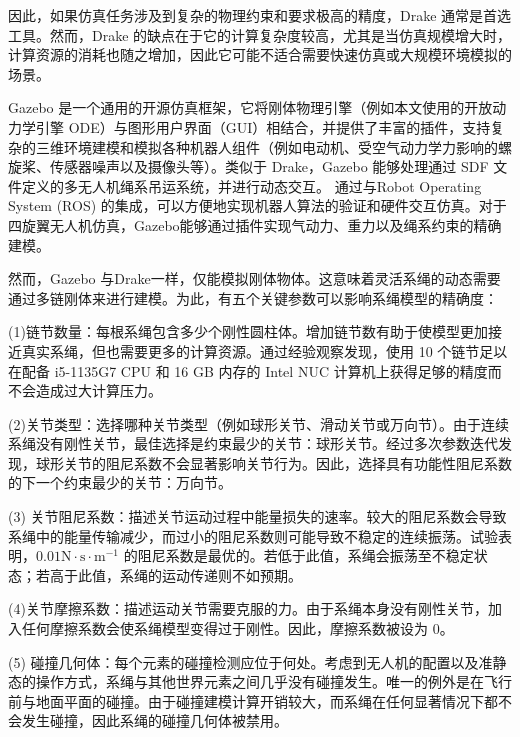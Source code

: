 \documentclass[lang=chs, degree=master, blindreview=true, winfonts=true]{yanputhesis}
\begin{document}
因此，如果仿真任务涉及到复杂的物理约束和要求极高的精度，Drake 通常是首选工具。然而，Drake 的缺点在于它的计算复杂度较高，尤其是当仿真规模增大时，计算资源的消耗也随之增加，因此它可能不适合需要快速仿真或大规模环境模拟的场景。

Gazebo 是一个通用的开源仿真框架，它将刚体物理引擎（例如本文使用的开放动力学引擎 ODE）与图形用户界面（GUI）相结合，并提供了丰富的插件，支持复杂的三维环境建模和模拟各种机器人组件（例如电动机、受空气动力学力影响的螺旋桨、传感器噪声以及摄像头等）。类似于 Drake，Gazebo 能够处理通过 SDF 文件定义的多无人机绳系吊运系统，并进行动态交互。
通过与Robot Operating System (ROS) 的集成，可以方便地实现机器人算法的验证和硬件交互仿真。对于四旋翼无人机仿真，Gazebo能够通过插件实现气动力、重力以及绳系约束的精确建模。

然而，Gazebo 与Drake一样，仅能模拟刚体物体。这意味着灵活系绳的动态需要通过多链刚体来进行建模。为此，有五个关键参数可以影响系绳模型的精确度：

(1){链节数量}：每根系绳包含多少个刚性圆柱体。增加链节数有助于使模型更加接近真实系绳，但也需要更多的计算资源。通过经验观察发现，使用 10 个链节足以在配备 i5-1135G7 CPU 和 16 GB 内存的 Intel NUC 计算机上获得足够的精度而不会造成过大计算压力。
    
(2){关节类型}：选择哪种关节类型（例如球形关节、滑动关节或万向节）。由于连续系绳没有刚性关节，最佳选择是约束最少的关节：球形关节。经过多次参数迭代发现，球形关节的阻尼系数不会显著影响关节行为。因此，选择具有功能性阻尼系数的下一个约束最少的关节：万向节。
    
(3) {关节阻尼系数}：描述关节运动过程中能量损失的速率。较大的阻尼系数会导致系绳中的能量传输减少，而过小的阻尼系数则可能导致不稳定的连续振荡。试验表明，$0.01  \text {N}\cdot \text{s} \cdot \text{m}^{-1}$ 
的阻尼系数是最优的。若低于此值，系绳会振荡至不稳定状态；若高于此值，系绳的运动传递则不如预期。
    
(4){关节摩擦系数}：描述运动关节需要克服的力。由于系绳本身没有刚性关节，加入任何摩擦系数会使系绳模型变得过于刚性。因此，摩擦系数被设为 0。
    
(5) {碰撞几何体}：每个元素的碰撞检测应位于何处。考虑到无人机的配置以及准静态的操作方式，系绳与其他世界元素之间几乎没有碰撞发生。唯一的例外是在飞行前与地面平面的碰撞。由于碰撞建模计算开销较大，而系绳在任何显著情况下都不会发生碰撞，因此系绳的碰撞几何体被禁用。
\end{document}
